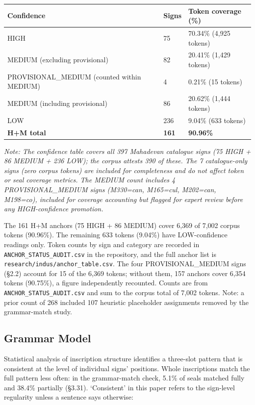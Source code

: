 \documentclass[11pt]{article}
\newcounter{none} %
\begin{document}
{\def\LTcaptype{none} %
\begin{longtable}[]{@{}lll@{}}
\toprule\noalign{}
Confidence & Signs & Token coverage (\%) \\
\midrule\noalign{}
\endhead
\bottomrule\noalign{}
\endlastfoot
HIGH & 75 & 70.34\% (4,925 tokens) \\ MEDIUM (excluding provisional) & 82 & 20.41\% (1,429 tokens) \\ PROVISIONAL\_MEDIUM (counted within MEDIUM) & 4 & 0.21\% (15 tokens) \\ MEDIUM (including provisional) & 86 & 20.62\% (1,444 tokens) \\ LOW & 236 & 9.04\% (633 tokens) \\ \textbf{H+M total} & \textbf{161} & \textbf{90.96\%} \\
\end{longtable}
}

\textit{Note: The confidence table covers all 397 Mahadevan catalogue signs (75 HIGH + 86 MEDIUM + 236 LOW); the corpus attests 390 of these. The 7 catalogue-only signs (zero corpus tokens) are included for completeness and do not affect token or seal coverage metrics. The MEDIUM count includes 4 PROVISIONAL\_MEDIUM signs (M330=\textit{can}, M165=\textit{cul}, M202=\textit{can}, M198=\textit{co}), included for coverage accounting but flagged for expert review before any HIGH-confidence promotion.}

The 161 H+M anchors (75 HIGH + 86 MEDIUM) cover 6,369 of 7,002 corpus tokens (90.96\%). The remaining 633 tokens (9.04\%) have LOW-confidence readings only. Token counts by sign and category are recorded in \texttt{ANCHOR\_STATUS\_AUDIT.csv} in the repository, and the full anchor list is \texttt{research/\allowbreak indus/\allowbreak anchor\_table.csv}. The four PROVISIONAL\_MEDIUM signs (§2.2) account for 15 of the 6,369 tokens; without them, 157 anchors cover 6,354 tokens (90.75\%), a figure independently recounted. Counts are from \texttt{ANCHOR\_STATUS\_AUDIT.csv} and sum to the corpus total of 7,002 tokens. Note: a prior count of 268 included 107 heuristic placeholder assignments removed by the grammar-match study.

\subsection{Grammar Model}\label{grammar-model}

Statistical analysis of inscription structure identifies a three-slot pattern that is consistent at the level of individual signs' positions. Whole inscriptions match the full pattern less often: in the grammar-match check, 5.1\% of seals matched fully and 38.4\% partially (§3.31). `Consistent' in this paper refers to the sign-level regularity unless a sentence says otherwise:
\end{document}

